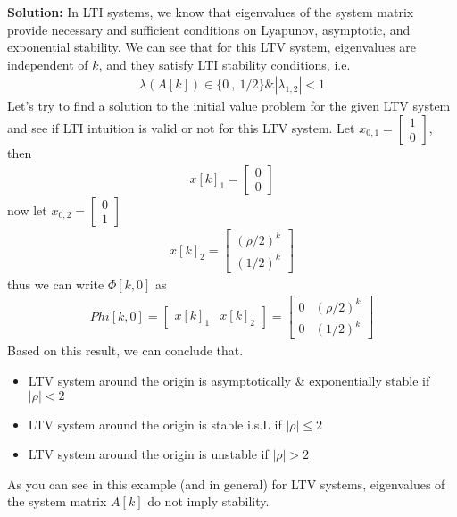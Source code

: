 \documentclass[twoside]{article}
\begin{document}
\textbf{Solution:} In LTI systems, we know that eigenvalues of the system matrix provide necessary and sufficient conditions on
Lyapunov, asymptotic, and exponential stability. We can see that for this LTV system, eigenvalues are independent of $k$, and
they satisfy LTI stability conditions, i.e.
%
\begin{align*}
  \lambda(A[k]) \in \lbrace 0 \ , \ 1/2 \rbrace \& | \lambda_{1,2} | < 1
\end{align*}
%
Let's try to find a solution to the initial value problem for the given LTV system and see if LTI intuition is valid or not for this LTV system. Let $x_{0,1} = \begin{bmatrix} 1 \\ 0 \end{bmatrix}$, then
%
\begin{align*}
   x[k]_1 = \begin{bmatrix} 0 \\ 0 \end{bmatrix}
\end{align*}
%
now let $x_{0,2} = \begin{bmatrix} 0 \\ 1 \end{bmatrix}$
%
%
\begin{align*}
   x[k]_2 = \begin{bmatrix} (\rho/2)^k \\ (1/2)^k \end{bmatrix}
\end{align*}
%
thus we can write $\Phi[k,0]$ as
%
\begin{align*}
   Phi[k,0] = \begin{bmatrix} x[k]_1 & x[k]_2 \end{bmatrix} = 
   \begin{bmatrix} 0 & (\rho/2)^k \\ 0 & (1/2)^k \end{bmatrix}
\end{align*}
%
Based on this result, we can conclude that.
%
\begin{itemize}
    \item LTV system around the origin is asymptotically \& exponentially stable if $|\rho| < 2$
    \item LTV system around the origin is stable i.s.L if $|\rho| \leq 2$
    \item LTV system around the origin is unstable if $|\rho| > 2$
\end{itemize}
%
As you can see in this example (and in general) for LTV systems, eigenvalues of the system matrix $A[k]$ do not imply stability.

\end{document}
